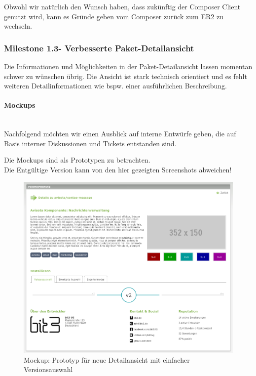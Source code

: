 \documentclass[
paper=a4,
draft=false,%
fontsize=10pt%
]{scrartcl}
\begin{document}
Obwohl wir natürlich den Wunsch haben, dass zukünftig der Composer Client genutzt wird, kann es Gründe geben vom Composer zurück zum ER2 zu wechseln.

\subsubsection[Milestone 1.3 - Verbesserte Paket-Detailansicht]{Milestone 1.3\footnotemark - Verbesserte Paket-Detailansicht}
\label{subsec:ccc-milestone-1.3}

Die Informationen und Möglichkeiten in der Paket-Detailansicht lassen momentan schwer zu wünschen übrig. Die Ansicht ist stark technisch orientiert und es fehlt weiteren Detailinformationen wie bspw. einer ausführlichen Beschreibung.

\paragraph{Mockups} ~\\
Nachfolgend möchten wir einen Ausblick auf interne Entwürfe geben, die auf Basis interner Diskussionen und Tickets entstanden sind.

\begin{danger}
Die Mockups sind als Prototypen zu betrachten. \\
Die Entgültige Version kann von den hier gezeigten Screenshots abweichen!
\end{danger}

\begin{figure}[p]
  \centering
  \includegraphics[width=\textwidth]{bilder/mockup-details-1}
  \caption{Mockup: Prototyp für neue Detailansicht mit einfacher Versionsauswahl}
\end{figure}
\end{document}
